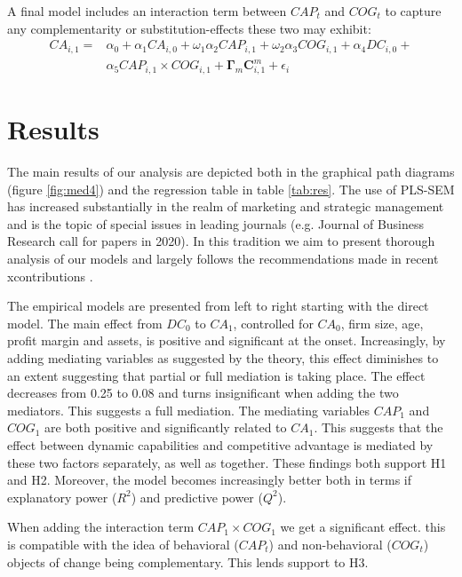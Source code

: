 \documentclass[review,fleqn]{elsarticle}\usepackage[]{graphicx}\usepackage[]{color}
\begin{document}
A final model includes an interaction term between $CAP_t$ and $COG_t$ to capture any
complementarity or substitution-effects these two may exhibit:
\begin{align}
  CA_{i,1}  = & \alpha_0 + \alpha_1 CA_{i,0} + \omega_1 \alpha_2 CAP_{i,1}
  + \omega_2 \alpha_3 COG_{i,1} + \alpha_{4} DC_{i,0} +  \\ \nonumber
  &\alpha_5 CAP_{i,1} \times  COG_{i,1} + \mathbf{\Gamma}_m\mathbf{C}^m_{i,1} + \epsilon_i
\end{align}


\section*{Results}
The main results of our analysis are depicted both in the graphical path diagrams (figure
\ref{fig:med4}) and the regression table in table \ref{tab:res}. The use of PLS-SEM has
increased substantially in the realm of marketing \citep{hult2018} and strategic management
\citep{Hair2012,Valaei2017} and is the topic of special issues in leading journals \citep{Hair2020} (e.g. Journal of
Business Research call for papers in 2020). In this tradition we aim to present thorough
analysis of our models and largely follows the recommendations made in recent
xcontributions \citep{Hair2019}.

The empirical models are presented from left to right starting with the direct model. The
main effect from $DC_0$ to $CA_1$, controlled for $CA_0$, firm size, age, profit margin
and assets, is positive and significant at the onset. Increasingly, by adding mediating
variables as suggested by the theory, this effect diminishes to an extent suggesting that
partial or full mediation is taking place. The effect decreases from 0.25 to 0.08 and
turns insignificant when adding the two mediators. This suggests a full mediation. The
mediating variables $CAP_1$ and $COG_1$ are both positive and significantly related to
$CA_1$. This suggests that the effect between dynamic capabilities and competitive
advantage is mediated by these two factors separately, as well as together. These findings
both support H1 and H2. Moreover, the model becomes increasingly better both in terms if
explanatory power ($R^2$) and predictive power ($Q^2$).

When adding the interaction term $CAP_1 \times COG_1$ we get a significant effect. this is
compatible with the idea of behavioral ($CAP_t$) and non-behavioral ($COG_t$) objects of
change being complementary. This lends support to H3.
\end{document}
